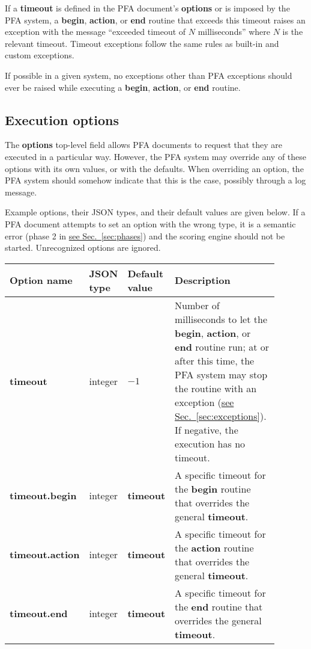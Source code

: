 \documentclass{article}
\newcommand{\PFAc}{\ttfamily\bfseries}
\theoremstyle{definition}
\begin{document}
If a {\PFAc timeout} is defined in the PFA document's {\PFAc options} or is imposed by the PFA system, a {\PFAc begin}, {\PFAc action}, or {\PFAc end} routine that exceeds this timeout raises an exception with the message ``exceeded timeout of $N$ milliseconds'' where $N$ is the relevant timeout.  Timeout exceptions follow the same rules as built-in and custom exceptions.

If possible in a given system, no exceptions other than PFA exceptions should ever be raised while executing a {\PFAc begin}, {\PFAc action}, or {\PFAc end} routine.

\hypertarget{hsec:options}{}
\subsection{Execution options}
\label{sec:options}

The {\PFAc options} top-level field allows PFA documents to request that they are executed in a particular way.  However, the PFA system may override any of these options with its own values, or with the defaults.  When overriding an option, the PFA system should somehow indicate that this is the case, possibly through a log message.

Example options, their JSON types, and their default values are given below.  If a PFA document attempts to set an option with the wrong type, it is a semantic error (phase 2 in \hyperlink{hsec:phases}{see Sec.~\ref{sec:phases}}) and the scoring engine should not be started. Unrecognized options are ignored.

\noindent\begin{longtable}{p{0.23\linewidth} p{0.12\linewidth} p{0.14\linewidth} p{0.4\linewidth}}
{\bf Option name} & {\bf JSON type} & {\bf Default value} & {\bf Description} \\\hline\endhead
{\PFAc timeout} & integer & $-1$ & Number of milliseconds to let the {\PFAc begin}, {\PFAc action}, or {\PFAc end} routine run; at or after this time, the PFA system may stop the routine with an exception (\hyperlink{hsec:exceptions}{see Sec.~\ref{sec:exceptions}}).  If negative, the execution has no timeout. \\
{\PFAc timeout.begin} & integer & {\PFAc timeout} & A specific timeout for the {\PFAc begin} routine that overrides the general {\PFAc timeout}. \\
{\PFAc timeout.action} & integer & {\PFAc timeout} & A specific timeout for the {\PFAc action} routine that overrides the general {\PFAc timeout}. \\
{\PFAc timeout.end} & integer & {\PFAc timeout} & A specific timeout for the {\PFAc end} routine that overrides the general {\PFAc timeout}. \\
\end{longtable}
\end{document}
